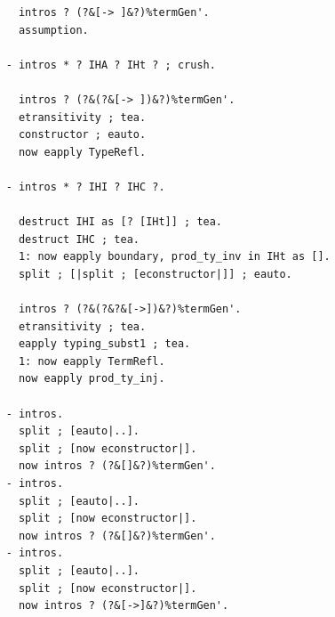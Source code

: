 \begin{lstlisting}
      intros ? (?&[-> ]&?)%termGen'.
      assumption.

    - intros * ? IHA ? IHt ? ; crush.
      
      intros ? (?&(?&[-> ])&?)%termGen'.
      etransitivity ; tea.
      constructor ; eauto.
      now eapply TypeRefl.

    - intros * ? IHI ? IHC ?.
    
      destruct IHI as [? [IHt]] ; tea.
      destruct IHC ; tea.
      1: now eapply boundary, prod_ty_inv in IHt as [].
      split ; [|split ; [econstructor|]] ; eauto.

      intros ? (?&(?&?&[->])&?)%termGen'.
      etransitivity ; tea.
      eapply typing_subst1 ; tea.
      1: now eapply TermRefl.
      now eapply prod_ty_inj.

    - intros.
      split ; [eauto|..].
      split ; [now econstructor|].
      now intros ? (?&[]&?)%termGen'.
    - intros.
      split ; [eauto|..].
      split ; [now econstructor|].
      now intros ? (?&[]&?)%termGen'.
    - intros.
      split ; [eauto|..].
      split ; [now econstructor|].
      now intros ? (?&[->]&?)%termGen'.
    

\end{lstlisting}
